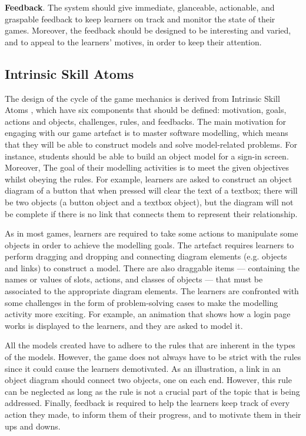 \documentclass[runningheads,a4paper]{llncs}
\begin{document}
\textbf{Feedback}. The system should give immediate, glanceable, actionable, and graspable feedback to keep learners on track and monitor the state of their games. Moreover, the feedback should be designed to be interesting and varied, and to appeal to the learners' motives, in order to keep their attention. 

\subsection{Intrinsic Skill Atoms}
The design of the cycle of the game mechanics is derived from Intrinsic Skill Atoms \cite{deterding2015lens}, which have six components that should be defined: motivation, goals, actions and objects, challenges, rules, and feedbacks. The main motivation for engaging with our game artefact is to master software modelling, which means that they will be able to construct models and solve model-related problems. For instance, students should be able to build an object model for a sign-in screen. Moreover, The goal of their modelling activities is to meet the given objectives whilst obeying the rules. For example, learners are asked to construct an object diagram of a button that when pressed will clear the text of a textbox; there will be two objects (a button object and a textbox object), but the diagram will not be complete if there is no link that connects them to represent their relationship. 

As in most games, learners are required to take some actions to manipulate some objects in order to achieve the modelling goals. The artefact requires learners to perform dragging and dropping and connecting diagram elements (e.g. objects and links) to construct a model.  There are also draggable items --- containing the names or values of slots, actions, and classes of objects --- that must be associated to the appropriate diagram elements. The learners are confronted with some challenges in the form of problem-solving cases to make the modelling activity more exciting. For example, an animation that shows how a login page works is displayed to the learners, and they are asked to model it. 

All the models created have to adhere to the rules that are inherent in the types of the models. However, the game does not always have to be strict with the rules since it could cause the learners demotivated. As an illustration, a link in an object diagram should connect two objects, one on each end. However, this rule can be neglected as long as the rule is not a crucial part of the topic that is being addressed. Finally, feedback is required to help the learners keep track of every action they made, to inform them of their progress, and to motivate them in their ups and downs.
\end{document}
